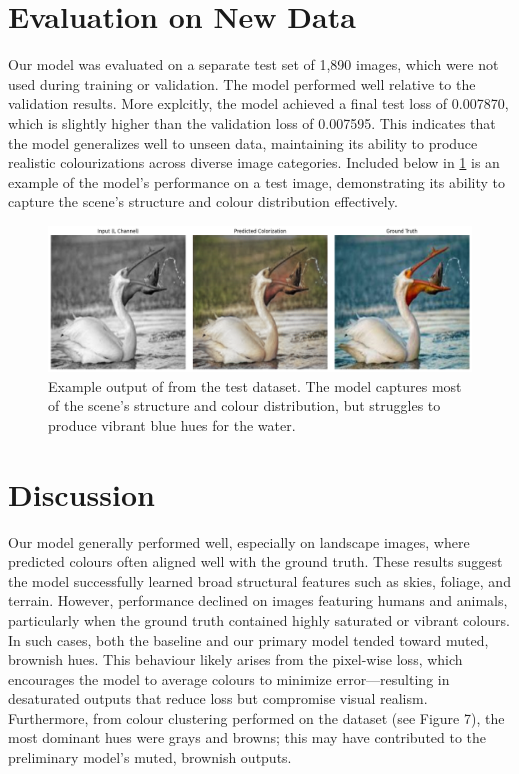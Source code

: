 \documentclass{article} %
\begin{document}
\section{Evaluation on New Data}
\label{new_data}

Our model was evaluated on a separate test set of 1,890 images, which were not used during training or validation. The model performed well relative to the validation results. More explcitly, the model achieved 
a final test loss of 0.007870, which is slightly higher than the validation loss of 0.007595. This indicates that the model generalizes well to unseen data, maintaining its ability to produce realistic colourizations across diverse image categories. 
Included below in \ref{fig:test-data-example} is an example of the model's performance on a test image, demonstrating its ability to capture the scene's structure and colour distribution effectively.

\begin{figure}[htbp]            %
  \centering
  \includegraphics[width=0.9\linewidth]{Figs/test_data_result_example.png}
  \caption{Example output of from the test dataset. The model captures most of the scene's structure and colour distribution, but struggles to produce vibrant blue hues for the water.}
  \label{fig:test-data-example}
\end{figure}

\section{Discussion}
\label{discussion}

Our model generally performed well, especially on landscape images, where predicted colours often aligned well with the ground truth. These results suggest the model successfully
learned broad structural features such as skies, foliage, and terrain. However, performance declined on images featuring humans and animals, particularly when the ground truth
contained highly saturated or vibrant colours. In such cases, both the baseline and our primary model tended toward muted, brownish hues. This behaviour likely arises from the
pixel-wise loss, which encourages the model to average colours to minimize error—resulting in desaturated outputs that reduce loss but compromise visual realism. Furthermore, from colour clustering performed on the dataset (see Figure 7), the most dominant hues were grays and browns; this may have contributed to the preliminary model's muted, brownish outputs. 
\end{document}
